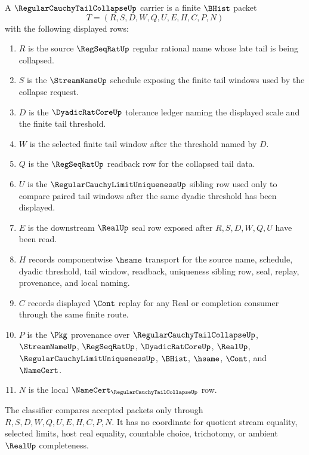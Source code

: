 \begin{definition}
\label{def:regular-cauchy-tail-collapse-carrier}
A $\RegularCauchyTailCollapseUp$ carrier is a finite $\BHist$ packet
$$
T=(R,S,D,W,Q,U,E,H,C,P,N)
$$
with the following displayed rows:
\begin{enumerate}
\item $R$ is the source $\RegSeqRatUp$ regular rational name whose late tail is being collapsed.
\item $S$ is the $\StreamNameUp$ schedule exposing the finite tail windows used by the collapse request.
\item $D$ is the $\DyadicRatCoreUp$ tolerance ledger naming the displayed scale and the finite tail threshold.
\item $W$ is the selected finite tail window after the threshold named by $D$.
\item $Q$ is the $\RegSeqRatUp$ readback row for the collapsed tail data.
\item $U$ is the $\RegularCauchyLimitUniquenessUp$ sibling row used only to compare paired tail windows after the same dyadic threshold has been displayed.
\item $E$ is the downstream $\RealUp$ seal row exposed after $R,S,D,W,Q,U$ have been read.
\item $H$ records componentwise $\hsame$ transport for the source name, schedule, dyadic threshold, tail window, readback, uniqueness sibling row, seal, replay, provenance, and local naming.
\item $C$ records displayed $\Cont$ replay for any Real or completion consumer through the same finite route.
\item $P$ is the $\Pkg$ provenance over $\RegularCauchyTailCollapseUp$, $\StreamNameUp$, $\RegSeqRatUp$, $\DyadicRatCoreUp$, $\RealUp$, $\RegularCauchyLimitUniquenessUp$, $\BHist$, $\hsame$, $\Cont$, and $\NameCert$.
\item $N$ is the local $\NameCert_{\RegularCauchyTailCollapseUp}$ row.
\end{enumerate}
The classifier compares accepted packets only through $R,S,D,W,Q,U,E,H,C,P,N$. It has no coordinate for quotient stream equality, selected limits, host real equality, countable choice, trichotomy, or ambient $\RealUp$ completeness.
\end{definition}

